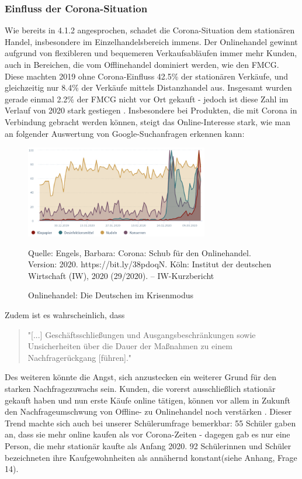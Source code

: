 \documentclass[a4paper, 12pt]{scrartcl}
\makeatletter
\newcommand*{\bildquelle}{%
  \footnotesize Quelle:
}
\newenvironment{folding}{\endgroup}{\begingroup \def \@currenvir{folding}\edef \@currenvline{\on@line}}
\makeatother
\begin{document}
\begin{folding} \subsubsection{Einfluss der Corona-Situation}
 
 Wie bereits in 4.1.2 angesprochen, schadet die Corona-Situation dem stationären Handel, insbesondere im Einzelhandelsbereich immens. Der Onlinehandel gewinnt aufgrund von flexibleren und bequemeren Verkaufsabläufen immer mehr Kunden, auch in Bereichen, die vom Offlinehandel dominiert werden, wie den \ac{FMCG}. 
Diese machten 2019 ohne Corona-Einfluss 42.5\% der stationären Verkäufe, und gleichzeitig nur 8.4\% der Verkäufe mittels Distanzhandel aus. Insgesamt wurden gerade einmal 2.2\% der \ac{FMCG} nicht vor Ort gekauft - jedoch ist diese Zahl im Verlauf von 2020 stark gestiegen \cite{corona-schub}. Insbesondere bei Produkten, die mit Corona in Verbindung gebracht werden können, steigt das Online-Interesse stark, wie man an folgender Auswertung von Google-Suchanfragen erkennen kann: 

 \begin{figure}[h]
    \begin{center}
        \includegraphics[width=8cm]{media/Fabian-Corona-Produkte.png}
        \caption{Onlinehandel: Die Deutschen im Krisenmodus}
        \label{corona-produkte}
        \bildquelle  Engels, Barbara:   Corona: Schub für den Onlinehandel. Version: 2020. https://bit.ly/38pdoqN. Köln: Institut der deutschen Wirtschaft (IW), 2020 (29/2020). – IW-Kurzbericht
    \end{center}
\end{figure}
\noindent Zudem ist es wahrscheinlich, dass

\begin{quote}
    "[...] Geschäftsschließungen und Ausgangsbeschränkungen   sowie Unsicherheiten über die Dauer der Maßnahmen zu einem  Nachfragerückgang [führen]." \cite{corona-wettbewerb}
\end{quote}
Des weiteren könnte die Angst, sich anzustecken ein weiterer Grund für den starken Nachfragezuwachs sein. Kunden, die vorerst ausschließlich stationär gekauft haben und nun erste Käufe online tätigen, können vor allem in Zukunft den Nachfrageumschwung von Offline- zu Onlinehandel noch verstärken \cite{corona-schub}. Dieser Trend machte sich auch bei unserer Schülerumfrage bemerkbar: 55 Schüler gaben an, dass sie mehr online kaufen als vor Corona-Zeiten - dagegen gab es nur eine Person, die mehr stationär kaufte als Anfang 2020. 92 Schülerinnen und Schüler bezeichneten ihre Kaufgewohnheiten als annähernd konstant(siehe Anhang, Frage 14).


\end{folding}
\end{document}
